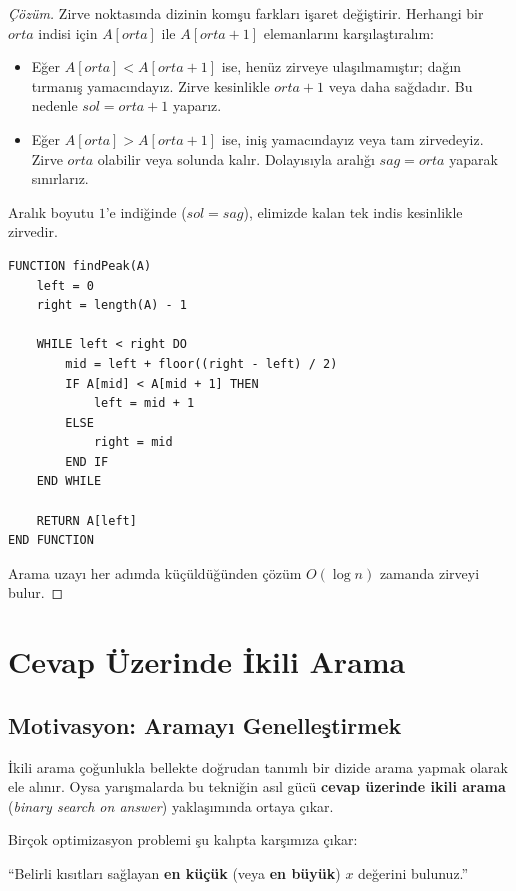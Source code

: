 \begin{proof}[Çözüm]
Zirve noktasında dizinin komşu farkları işaret değiştirir.
Herhangi bir $orta$ indisi için $A[orta]$ ile $A[orta + 1]$ elemanlarını karşılaştıralım:
\begin{itemize}
    \item Eğer $A[orta] < A[orta + 1]$ ise, henüz zirveye ulaşılmamıştır; dağın tırmanış yamacındayız. Zirve kesinlikle $orta + 1$ veya daha sağdadır. Bu nedenle $sol = orta + 1$ yaparız.
    \item Eğer $A[orta] > A[orta + 1]$ ise, iniş yamacındayız veya tam zirvedeyiz. Zirve $orta$ olabilir veya solunda kalır. Dolayısıyla aralığı $sag = orta$ yaparak sınırlarız.
\end{itemize}

Aralık boyutu $1$'e indiğinde ($sol = sag$), elimizde kalan tek indis kesinlikle zirvedir.

\begin{lstlisting}
FUNCTION findPeak(A)
    left = 0
    right = length(A) - 1

    WHILE left < right DO
        mid = left + floor((right - left) / 2)
        IF A[mid] < A[mid + 1] THEN
            left = mid + 1
        ELSE
            right = mid
        END IF
    END WHILE

    RETURN A[left]
END FUNCTION\end{lstlisting}
Arama uzayı her adımda küçüldüğünden çözüm $O(\log n)$ zamanda zirveyi bulur.
\end{proof}

\section{Cevap Üzerinde İkili Arama}

\subsection{Motivasyon: Aramayı Genelleştirmek}

İkili arama çoğunlukla bellekte doğrudan tanımlı bir dizide arama yapmak olarak ele alınır. Oysa yarışmalarda bu tekniğin asıl gücü \textbf{cevap üzerinde ikili arama} (\emph{binary search on answer}) yaklaşımında ortaya çıkar.

Birçok optimizasyon problemi şu kalıpta karşımıza çıkar:
\begin{center}
``Belirli kısıtları sağlayan \textbf{en küçük} (veya \textbf{en büyük}) $x$ değerini bulunuz.''
\end{center}

